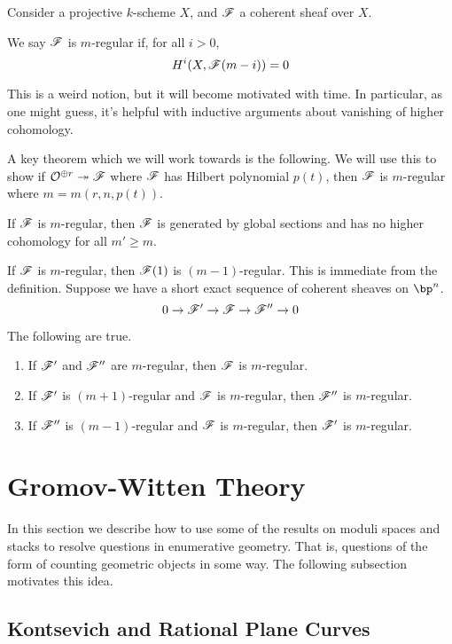 \documentclass[12pt]{article}
\begin{document}
Consider a projective $k$-scheme $X$, and $\mathscr{F}$ a coherent sheaf over $X$. 
\begin{defn}
  We say $\mathscr{F}$ is $m$-regular if, for all $i > 0$,
  \[H^i(X, \mathscr{F}(m-i)) = 0\]
\end{defn}

\begin{rem}
  This is a weird notion, but it will become motivated with time. In particular, as one might guess, it's helpful with inductive arguments about vanishing of higher cohomology.
\end{rem}

A key theorem which we will work towards is the following. We will use this to show if $\mathcal{O}^{\oplus r} \twoheadrightarrow \mathscr{F}$ where $\mathscr{F}$ has Hilbert polynomial $p(t)$, then $\mathscr{F}$ is $m$-regular where $m = m(r, n, p(t))$.

\begin{thm}
  If $\mathscr{F}$ is $m$-regular, then $\mathscr{F}$ is generated by global sections and has no higher cohomology for all $m' \geq m$.
\end{thm}
If $\mathscr{F}$ is $m$-regular, then $\mathscr{F}(1)$ is $(m-1)$-regular. This is immediate from the definition. Suppose we have a short exact sequence of coherent sheaves on $\bp^n$.
\[0 \to \mathscr{F}' \to \mathscr{F} \to \mathscr{F}'' \to 0\]
\begin{prop}
  The following are true.
  \begin{enumerate}[label=(\roman*)]
      \item If $\mathscr{F}'$ and $\mathscr{F}''$ are $m$-regular, then $\mathscr{F}$ is $m$-regular.
      \item If $\mathscr{F}'$ is $(m+1)$-regular and $\mathscr{F}$ is $m$-regular, then $\mathscr{F}''$ is $m$-regular.
      \item If $\mathscr{F}''$ is $(m-1)$-regular and $\mathscr{F}$ is $m$-regular, then $\mathscr{F}'$ is $m$-regular.
  \end{enumerate}
\end{prop}

\section{Gromov-Witten Theory}

In this section we describe how to use some of the results on moduli spaces and stacks to resolve questions in enumerative geometry. That is, questions of the form of counting geometric objects in some way. The following subsection motivates this idea.

\subsection{Kontsevich and Rational Plane Curves}
\end{document}

